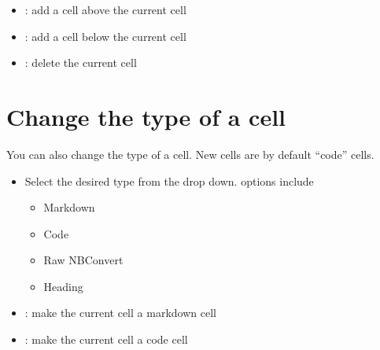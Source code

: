 \documentclass[letterpaper,10pt,english]{jupyterBook}
\begin{document}
\sphinxAtStartPar
{}
\begin{itemize}
\item {} 
\sphinxAtStartPar
{}: add a cell above the current cell

\item {} 
\sphinxAtStartPar
{}: add a cell below the current cell

\item {} 
\sphinxAtStartPar
{}: delete the current cell

\end{itemize}


\section{Change the type of a cell}
\label{\detokenize{content/04_PythonEssentials/Intro_Jupyter_notebook:change-the-type-of-a-cell}}
\sphinxAtStartPar
You can also change the type of a cell. New cells are by default “code” cells.

\sphinxAtStartPar
{}
\begin{itemize}
\item {} 
\sphinxAtStartPar
Select the desired type from the drop down.  options include
\begin{itemize}
\item {} 
\sphinxAtStartPar
Markdown

\item {} 
\sphinxAtStartPar
Code

\item {} 
\sphinxAtStartPar
Raw NBConvert

\item {} 
\sphinxAtStartPar
Heading

\end{itemize}

\end{itemize}

\sphinxAtStartPar
{}
\begin{itemize}
\item {} 
\sphinxAtStartPar
{}: make the current cell a markdown cell

\item {} 
\sphinxAtStartPar
{}: make the current cell a code  cell

\end{itemize}
\end{document}

